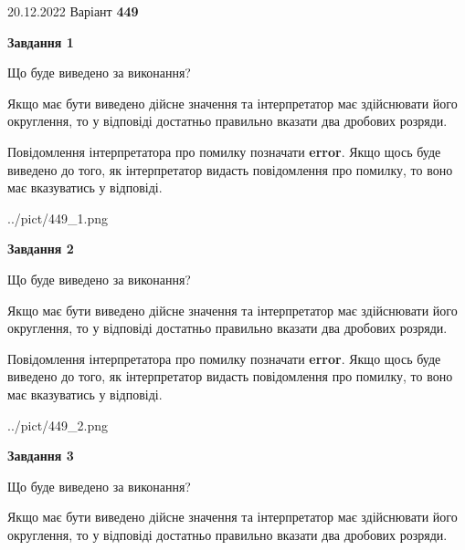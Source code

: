 \documentclass[12pt, ukrainian]{article}
\begin{document}
{20.12.2022 Варіант \No \textbf { 449 }\par}
{
\begin {Large}

{\begin {center}\textbf{Завдання 1}\end {center}}\par
Що буде виведено за виконання? \par

Якщо має бути виведено дійсне значення та інтерпретатор має здійснювати його округлення, 
то у відповіді достатньо правильно вказати два дробових розряди.

Повідомлення інтерпретатора про помилку позначати \textbf{error}.
Якщо щось буде виведено до того, як інтерпретатор видасть повідомлення про помилку, 
то воно має вказуватись у відповіді. \par

\begin{center}
	{../pict/449_1.png}
\end{center}
\newpage

{\begin {center}\textbf{Завдання 2}\end {center}}\par
Що буде виведено за виконання? \par

Якщо має бути виведено дійсне значення та інтерпретатор має здійснювати його округлення, 
то у відповіді достатньо правильно вказати два дробових розряди.

Повідомлення інтерпретатора про помилку позначати \textbf{error}.
Якщо щось буде виведено до того, як інтерпретатор видасть повідомлення про помилку, 
то воно має вказуватись у відповіді. \par

\begin{center}
	{../pict/449_2.png}
\end{center}
\newpage

{\begin {center}\textbf{Завдання 3}\end {center}}\par
Що буде виведено за виконання? \par

Якщо має бути виведено дійсне значення та інтерпретатор має здійснювати його округлення, 
то у відповіді достатньо правильно вказати два дробових розряди.


\end{Large}}
\end{document}
